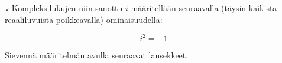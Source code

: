 \begin{tehtavasivu}
\begin{tehtava}
$\star$ Kompleksilukujen niin sanottu  $i$ määritellään seuraavalla (täysin kaikista reaaliluvuista poikkeavalla) ominaisuudella:

$$i^2=-1$$

Sievennä määritelmän avulla seuraavat lausekkeet.
	\begin{vastaus}
	\end{vastaus}
\end{tehtava}

\end{tehtavasivu}